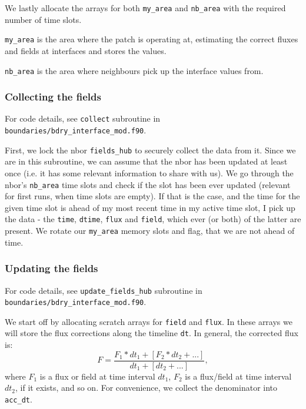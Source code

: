 \documentclass[paper=a4,fontsize=11pt]{scrartcl}
\numberwithin{equation}{section}		%
\numberwithin{figure}{section}			%
\numberwithin{table}{section}				%
\newcommand{\codecolor}{\color{Blue}}
\newcommand{\filecolor}{\color{NavyBlue}}
\newcommand{\File}[1]{{\filecolor\texttt{#1}}}
\newcommand{\Code}[1]{{\codecolor\texttt{#1}}}
\begin{document}
We lastly allocate the arrays for both \Code{my\_area} and \Code{nb\_area} with the required number of time slots.

\Code{my\_area} is the area where the patch is operating at, estimating the correct fluxes and fields at interfaces and stores the values.

\Code{nb\_area} is the area where neighbours pick up the interface values from.


\subsubsection{Collecting the fields}
For code details, see \Code{collect} subroutine in \File{boundaries/bdry\_interface\_mod.f90}.

First, we lock the nbor \Code{fields\_hub} to securely collect the data from it. Since we are in this subroutine, we can assume that the nbor has been updated at least once (i.e. it has some relevant information to share with us). We go through the nbor's \Code{nb\_area} time slots and check if the slot has been ever updated (relevant for first runs, when time slots are empty). If that is the case, and the time for the given time slot is ahead of my most recent time in my active time slot, I pick up the data - the  \Code{time}, \Code{dtime}, \Code{flux} and \Code{field}, which ever (or both) of the latter are present. We rotate our \Code{my\_area} memory slots and flag, that we are not ahead of time.

\subsubsection{Updating the fields}
For code details, see \Code{update\_fields\_hub} subroutine in \File{boundaries/bdry\_interface\_mod.f90}.

We start off by allocating scratch arrays for \Code{field} and \Code{flux}. In these arrays we will store the flux corrections along the timeline \Code{dt}. In general, the corrected flux is:
\begin{equation}
    F = \frac{ F_1*dt_1 + [F_2*dt_2+...]}{dt_1+[dt_2 + ...]},
\end{equation}
where  $F_1$ is a flux or field at time interval $dt_1$, $F_2$ is a flux/field at time interval $dt_2$, if it exists, and so on. For convenience, we collect the denominator into \Code{acc\_dt}.
\end{document}
